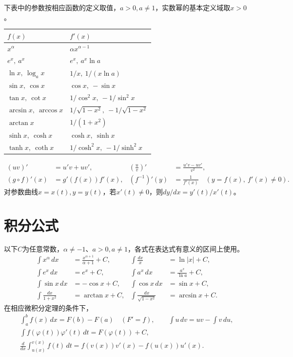 下表中的参数按相应函数的定义取值，\(a>0,a\ne1\)，实数幂的基本定义域取\(x>0\)。
\begingroup
\renewcommand{\arraystretch}{1.1}
\begin{longtable}{@{}p{.44\linewidth}p{.48\linewidth}@{}}
\toprule
\(f(x)\) & \(f'(x)\) \\
\midrule
\endhead
\(x^\alpha\) & \(\alpha x^{\alpha-1}\) \\
\(e^x,\ a^x\) & \(e^x,\ a^x\ln a\) \\
\(\ln x,\ \log_a x\) & \(1/x,\ 1/(x\ln a)\) \\
\(\sin x,\ \cos x\) & \(\cos x,\ -\sin x\) \\
\(\tan x,\ \cot x\) & \(1/\cos^2x,\ -1/\sin^2x\) \\
\(\arcsin x,\ \arccos x\) & \(1/\sqrt{1-x^2},\ -1/\sqrt{1-x^2}\) \\
\(\arctan x\) & \(1/(1+x^2)\) \\
\(\sinh x,\ \cosh x\) & \(\cosh x,\ \sinh x\) \\
\(\tanh x,\ \coth x\) & \(1/\cosh^2x,\ -1/\sinh^2x\) \\
\bottomrule
\end{longtable}
\endgroup
\begin{equation*}
 \begin{aligned}
 (uv)'&=u'v+uv',&
 \left(\frac uv\right)'&=\frac{u'v-uv'}{v^2},\\
 (g\circ f)'(x)&=g'(f(x))f'(x),&
 (f^{-1})'(y)&=\frac1{f'(x)}\quad(y=f(x),\ f'(x)\ne0).
 \end{aligned}
\end{equation*}
对参数曲线\(x=x(t),y=y(t)\)，若\(x'(t)\ne0\)，则\(dy/dx=y'(t)/x'(t)\)。

\section{积分公式}

以下\(C\)为任意常数，\(\alpha\ne-1\)、\(a>0,a\ne1\)，各式在表达式有意义的区间上使用。
\begin{equation*}
 \begin{aligned}
 \int x^\alpha\,dx&=\frac{x^{\alpha+1}}{\alpha+1}+C,&
 \int\frac{dx}{x}&=\ln|x|+C,\\
 \int e^x\,dx&=e^x+C,&
 \int a^x\,dx&=\frac{a^x}{\ln a}+C,\\
 \int\sin x\,dx&=-\cos x+C,&
 \int\cos x\,dx&=\sin x+C,\\
 \int\frac{dx}{1+x^2}&=\arctan x+C,&
 \int\frac{dx}{\sqrt{1-x^2}}&=\arcsin x+C.
 \end{aligned}
\end{equation*}
在相应微积分定理的条件下，
\begin{equation*}
 \begin{gathered}
 \int_a^b f(x)\,dx=F(b)-F(a)\quad(F'=f),\qquad
 \int u\,dv=uv-\int v\,du,\\
 \int f(\varphi(t))\varphi'(t)\,dt=F(\varphi(t))+C,\\
 \frac d{dx}\int_{u(x)}^{v(x)}f(t)\,dt
 =f(v(x))v'(x)-f(u(x))u'(x).
 \end{gathered}
\end{equation*}

